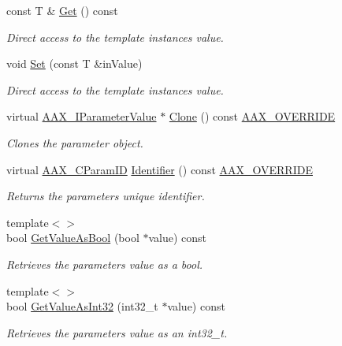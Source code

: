 \begin{DoxyCompactItemize}
const T \& \hyperlink{a00035_ad990abd20ac1221554fcc6d27b108de5}{Get} () const 
\begin{DoxyCompactList}\small\item\em Direct access to the template instance\textquotesingle{}s value. \end{DoxyCompactList}\item 
void \hyperlink{a00035_a72303342bc5133e039264549f3c44d87}{Set} (const T \&in\+Value)
\begin{DoxyCompactList}\small\item\em Direct access to the template instance\textquotesingle{}s value. \end{DoxyCompactList}\item 
virtual \hyperlink{a00109}{A\+A\+X\+\_\+\+I\+Parameter\+Value} $\ast$ \hyperlink{a00035_a234b97e3ab25aad807cff8b5332624f5}{Clone} () const \hyperlink{a00149_ac2f24a5172689ae684344abdcce55463}{A\+A\+X\+\_\+\+O\+V\+E\+R\+R\+I\+D\+E}
\begin{DoxyCompactList}\small\item\em Clones the parameter object. \end{DoxyCompactList}\item 
virtual \hyperlink{a00149_a1440c756fe5cb158b78193b2fc1780d1}{A\+A\+X\+\_\+\+C\+Param\+I\+D} \hyperlink{a00035_a81029fe02250db20625b42f58b56659d}{Identifier} () const \hyperlink{a00149_ac2f24a5172689ae684344abdcce55463}{A\+A\+X\+\_\+\+O\+V\+E\+R\+R\+I\+D\+E}
\begin{DoxyCompactList}\small\item\em Returns the parameter\textquotesingle{}s unique identifier. \end{DoxyCompactList}\item 
{\footnotesize template$<$$>$ }\\bool \hyperlink{a00035_a10763c0784f9e5e62fdadae47a54cee2}{Get\+Value\+As\+Bool} (bool $\ast$value) const
\begin{DoxyCompactList}\small\item\em Retrieves the parameter\textquotesingle{}s value as a bool. \end{DoxyCompactList}\item 
{\footnotesize template$<$$>$ }\\bool \hyperlink{a00035_a8df0b77c93c527392e51e3d82d026d87}{Get\+Value\+As\+Int32} (int32\+\_\+t $\ast$value) const
\begin{DoxyCompactList}\small\item\em Retrieves the parameter\textquotesingle{}s value as an int32\+\_\+t. \end{DoxyCompactList}\item 

\end{DoxyCompactItemize}
